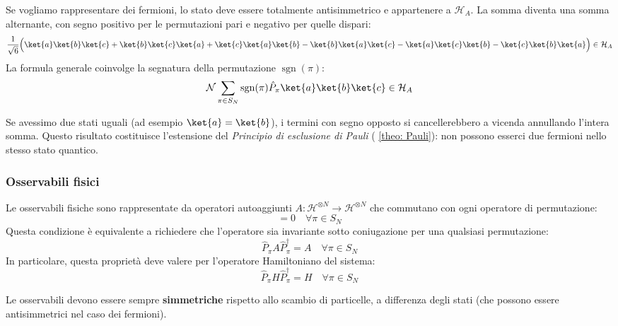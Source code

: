 \begin{example}
    Se vogliamo rappresentare dei fermioni, lo stato deve essere totalmente antisimmetrico e appartenere a \(\mathcal{H}_A\). La somma diventa una somma alternante, con segno positivo per le permutazioni pari e negativo per quelle dispari:
    \[
        \frac{1}{\sqrt{6}}\Big( \ket{a}\ket{b}\ket{c} + \ket{b}\ket{c}\ket{a} + \ket{c}\ket{a}\ket{b} - \ket{b}\ket{a}\ket{c} - \ket{a}\ket{c}\ket{b} - \ket{c}\ket{b}\ket{a} \Big) \in \mathcal{H}_A
    \]
    La formula generale coinvolge la segnatura della permutazione \(\operatorname{sgn}(\pi)\):
    \[
        \mathcal{N} \sum_{\pi \in S_N} \operatorname{sgn}(\pi) \hat{P}_\pi \ket{a}\ket{b}\ket{c} \in \mathcal{H}_A
    \]
    \begin{attention}
        Se avessimo due stati uguali (ad esempio \(\ket{a} = \ket{b}\)), i termini con segno opposto si cancellerebbero a vicenda annullando l'intera somma.
        Questo risultato costituisce l'estensione del \textit{Principio di esclusione di Pauli} ( \ref{theo: Pauli}): non possono esserci due fermioni nello stesso stato quantico.
    \end{attention}
\end{example}

\subsubsection{Osservabili fisici}
Le osservabili fisiche sono rappresentate da operatori autoaggiunti \(A: \mathcal{H}^{\otimes N} \to \mathcal{H}^{\otimes N}\) che commutano con ogni operatore di permutazione:
    \begin{equation}
        [A, \hat{P}_\pi] = 0 \quad \forall \pi \in S_N
    \end{equation}
    Questa condizione è equivalente a richiedere che l'operatore sia invariante sotto coniugazione per una qualsiasi permutazione:
    \begin{equation}
        \hat{P}_\pi A \hat{P}_\pi^\dagger = A \quad \forall \pi \in S_N
    \end{equation}
In particolare, questa proprietà deve valere per l'operatore Hamiltoniano del sistema:
    \begin{equation}
        \hat{P}_\pi H \hat{P}_\pi^\dagger = H \quad \forall \pi \in S_N
    \end{equation}

\begin{attention}
    Le osservabili devono essere sempre \textbf{simmetriche} rispetto allo scambio di particelle, a differenza degli stati (che possono essere antisimmetrici nel caso dei fermioni).
\end{attention}

